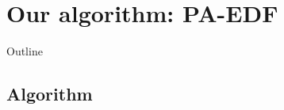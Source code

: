 \documentclass{beamer}
\begin{document}



\section{Our algorithm: PA-EDF}

\begin{frame}{Outline}
    \tableofcontents[currentsection]
\end{frame}

\subsection{Algorithm}
\end{document}
